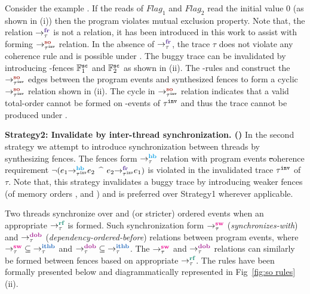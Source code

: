 Consider the example . If the reads of $Flag_1$ and $Flag_2$ 
read the initial value $0$ (as shown in (i)) 
then the program violates mutual exclusion
property. Note that, the relation $\setFR$ is not a \cc relation, it has
been introduced in this work to assist with forming $\setSO$ relation.
In the absence of $\setFR$, the trace $\tau$ does not violate any coherence
rule and is possible under \cc.
%
The buggy trace can be invalidated by introducing \sc-fences $\mathbb{F}^\sc_1$
and $\mathbb{F}^\sc_2$ as shown in (ii). The \lso-rules
 and  
construct the $\so{\inv{\tau}}{}{}$ edges between the program events 
and synthesized fences to form a cyclic $\so{\inv{\tau}}{}{}$ relation 
shown in (ii).
The cycle in $\so{\inv{\tau}}{}{}$ relation indicates that a valid 
total-order cannot be formed on \sc-events of $\inv{\tau}$ and thus the 
trace cannot be produced under \cc.\newline

\noindent
{\bf Strategy2: Invalidate by inter-thread synchronization.
(\wfence)}\newline
In the second strategy we attempt to introduce synchronization
between threads by synthesizing fences. The fences form
$\setHB$ relation with program events \st coherence
requirement
$\neg(\hb{\inv{\tau}}{e_1}{e_2}$ $\^$ $\fr{\inv{\tau}}{e_2}{e_1})$ is
violated in the invalidated trace $\inv{\tau}$ of $\tau$.
%
Note that, this strategy invalidates a buggy trace by introducing 
weaker fences (of memory orders \rel, \acq and \acqrel) and 
is preferred over Strategy1 wherever applicable.

Two threads synchronize over \rel and \acq (or stricter) ordered
events when an appropriate $\setRF$ is formed. Such synchronization
form $\setSW$ ({\it synchronizes-with}) and $\setDOB$ 
({\it dependency-ordered-before}) relations between program events,
\cite{batty2011mathematizing}\cite{C11}
where $\setSW \subseteq \setITHB$ and $\setDOB \subseteq \setITHB$.
%
The $\setSW$ and $\setDOB$ relations can similarly be formed between
fences based on appropriate $\setRF$. 
The rules have been formally presented 
below and diagrammatically represented in Fig~\ref{fig:so rules}(ii).

